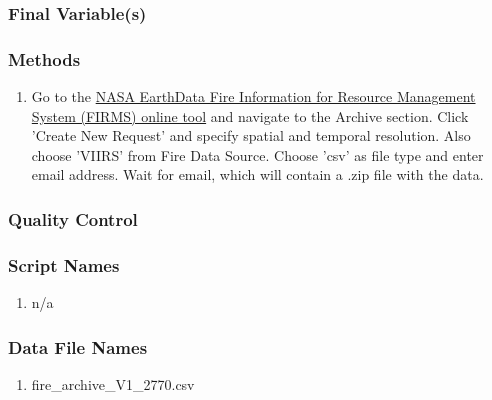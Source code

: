 \subsubsection*{Final Variable(s)}
\subsubsection*{Methods}
\begin{enumerate}
\item Go to the \href{https://firms.modaps.eosdis.nasa.gov/download/}{NASA EarthData Fire Information for Resource Management System (FIRMS) online tool} and navigate to the Archive section. Click 'Create New Request' and specify spatial and temporal resolution. Also choose 'VIIRS' from Fire Data Source. Choose 'csv' as file type and enter email address. Wait for email, which will contain a .zip file with the data.
\end{enumerate}
\subsubsection*{Quality Control}
\subsubsection*{Script Names}
\begin{enumerate}
\item n/a
\end{enumerate}
\subsubsection*{Data File Names}
\begin{enumerate}
\item fire\_archive\_V1\_2770.csv
\end{enumerate}
